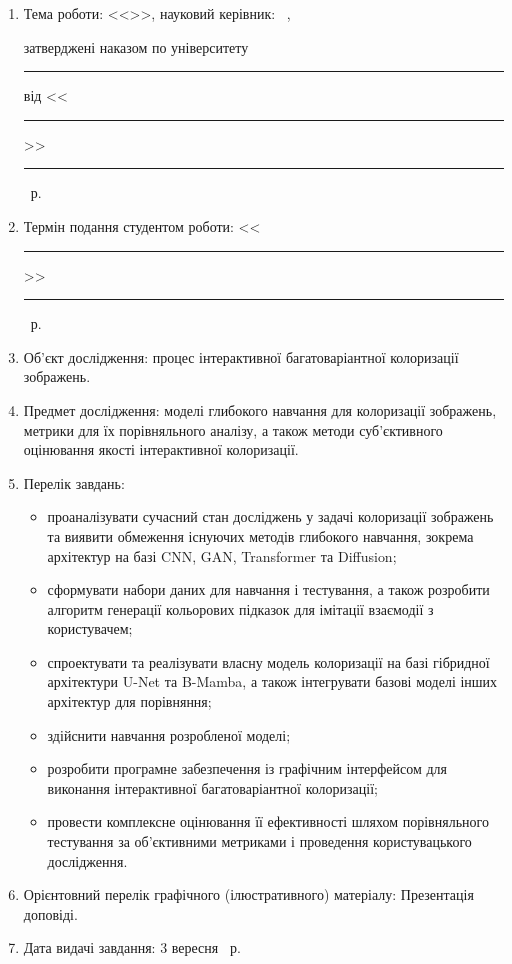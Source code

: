 \begin{enumerate}[label=\arabic*.]
    \item 
        Тема роботи: <<\emph{\reportTitle}>>, %
        науковий керівник: \supervisorRegalia ~\supervisorPib, \par
        затверджені наказом по університету \textnumero \rule{0.5cm}{0.25pt} від <<\rule{0.5cm}{0.25pt}>> \rule{2.5cm}{0.25pt} \YearOfDefence~р.

    \item Термін подання студентом роботи:
        <<\rule{0.5cm}{0.25pt}>> \rule{2.5cm}{0.25pt} \YearOfDefence~р.

    \item Об'єкт дослідження:
        процес інтерактивної багатоваріантної колоризації зображень.

    \item Предмет дослідження:
        моделі глибокого навчання для колоризації зображень,
        метрики для їх порівняльного аналізу,
        а також методи суб'єктивного оцінювання якості інтерактивної колоризації.

    \item Перелік завдань: %
        \begin{itemize}[label=$\bullet$]
            \item проаналізувати сучасний стан досліджень у задачі колоризації зображень та виявити обмеження існуючих методів глибокого навчання, зокрема архітектур на базі CNN, GAN, Transformer та Diffusion;
            \item сформувати набори даних для навчання і тестування, а також розробити алгоритм генерації кольорових підказок для імітації взаємодії з користувачем;
            \item спроектувати та реалізувати власну модель колоризації на базі гібридної архітектури U-Net та B-Mamba, а також інтегрувати базові моделі інших архітектур для порівняння;
            \item здійснити навчання розробленої моделі;
            \item розробити програмне забезпечення із графічним інтерфейсом для виконання інтерактивної багатоваріантної колоризації;
            \item провести комплексне оцінювання її ефективності шляхом порівняльного тестування за об'єктивними метриками і проведення користувацького дослідження.
        \end{itemize}

    \item 
        Орієнтовний перелік графічного (ілюстративного) матеріалу: Презентація доповіді.

    \item
        Дата видачі завдання: 3 вересня \YearOfBeginning~р.
\end{enumerate}

